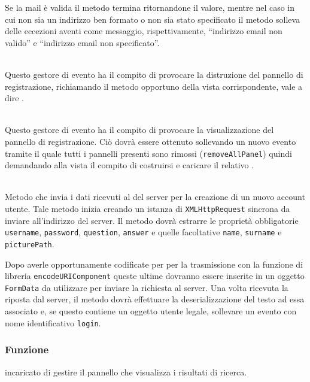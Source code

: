 \begin{description}
Se la mail è valida il metodo termina ritornandone il valore, mentre nel caso in cui non sia un indirizzo ben formato o non sia stato specificato il metodo solleva delle eccezioni aventi come messaggio, rispettivamente, ``indirizzo email non valido'' e ``indirizzo email non specificato''.

	\item{}\\
	Questo gestore di evento ha il compito di provocare la distruzione del pannello di registrazione, richiamando il metodo opportuno della vista corrispondente, vale a dire .
	
	\item{}\\
	Questo gestore di evento ha il compito di provocare la visualizzazione del pannello di registrazione. Ciò dovrà essere ottenuto sollevando un nuovo evento tramite il quale tutti i pannelli presenti sono rimossi (\verb'removeAllPanel') quindi demandando alla vista il compito di costruirsi e caricare il relativo .
	
	\item{}\\
	Metodo che invia i dati ricevuti al  del server per la creazione di un nuovo account utente. Tale metodo inizia creando un istanza di \texttt{XMLHttpRequest} sincrona da inviare all'indirizzo del server. Il metodo dovrà estrarre le proprietà obbligatorie \verb'username', \verb'password', \verb'question', \verb'answer' e quelle facoltative \verb'name', \verb'surname' e \verb'picturePath'.
	
	Dopo averle opportunamente codificate per per la trasmissione con la funzione di libreria \verb'encodeURIComponent' queste ultime dovranno essere inserite in un oggetto \verb'FormData' da utilizzare per inviare la richiesta al server. Una volta ricevuta la riposta dal server, il metodo dovrà effettuare la deserializzazione del testo ad essa associato e, se questo contiene un oggetto utente legale, sollevare un evento con nome identificativo \verb'login'.

\end{description}



\subsubsection*{Funzione}
 incaricato di gestire il pannello che visualizza i risultati di ricerca.

